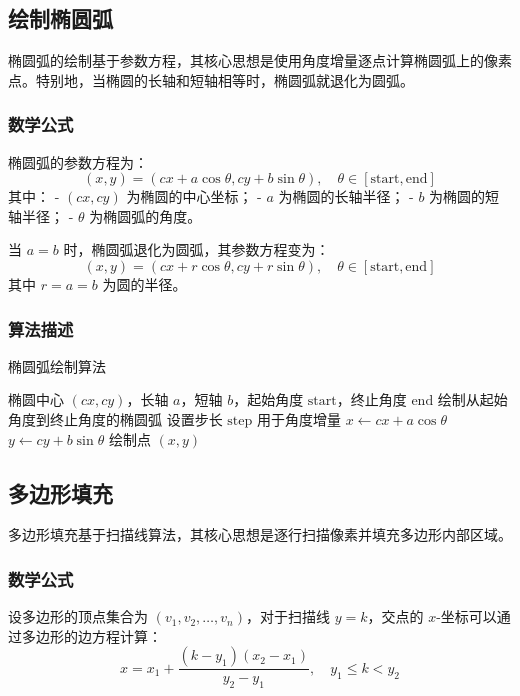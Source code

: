 \documentclass[11pt,a4paper]{article}
\begin{document}
\subsection{绘制椭圆弧}
椭圆弧的绘制基于参数方程，其核心思想是使用角度增量逐点计算椭圆弧上的像素点。特别地，当椭圆的长轴和短轴相等时，椭圆弧就退化为圆弧。

\subsubsection{数学公式}
椭圆弧的参数方程为：
\[
(x, y) = (cx + a \cos \theta, cy + b \sin \theta), \quad \theta \in [\text{start}, \text{end}]
\]
其中：
- \((cx, cy)\) 为椭圆的中心坐标；
- \(a\) 为椭圆的长轴半径；
- \(b\) 为椭圆的短轴半径；
- \(\theta\) 为椭圆弧的角度。

当 \(a = b\) 时，椭圆弧退化为圆弧，其参数方程变为：
\[
(x, y) = (cx + r \cos \theta, cy + r \sin \theta), \quad \theta \in [\text{start}, \text{end}]
\]
其中 \(r = a = b\) 为圆的半径。

\subsubsection{算法描述}
\begin{algorithm}[H]
\caption{椭圆弧绘制算法}
\begin{algorithmic}[1]
\Require 椭圆中心 \((cx, cy)\)，长轴 \(a\)，短轴 \(b\)，起始角度 \(\text{start}\)，终止角度 \(\text{end}\)
\Ensure 绘制从起始角度到终止角度的椭圆弧
\State 设置步长 \(\text{step}\) 用于角度增量
    \State \(x \gets cx + a \cos \theta\)
    \State \(y \gets cy + b \sin \theta\)
    \State 绘制点 \((x, y)\)
\EndFor
\end{algorithmic}
\end{algorithm}

\subsection{多边形填充}
多边形填充基于扫描线算法，其核心思想是逐行扫描像素并填充多边形内部区域。

\subsubsection{数学公式}
设多边形的顶点集合为 \((v_1, v_2, \dots, v_n)\)，对于扫描线 \(y = k\)，交点的 \(x\)-坐标可以通过多边形的边方程计算：
\[
x = x_1 + \frac{(k - y_1)(x_2 - x_1)}{y_2 - y_1}, \quad y_1 \leq k < y_2
\]
\end{document}
